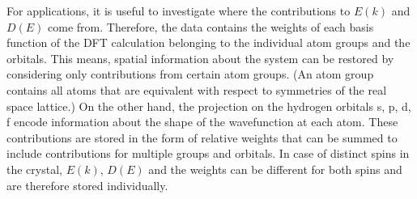 For applications, it is useful to investigate where the contributions to $E(k)$ and $D(E)$ come from. Therefore, the data contains the weights of each basis function of the DFT calculation belonging to the individual atom groups and the orbitals. This means, spatial information about the system can be restored by considering only contributions from certain atom groups. (An atom group contains all atoms that are equivalent with respect to symmetries of the real space lattice.) On the other hand, the projection on the hydrogen orbitals s, p, d, f encode information about the shape of the wavefunction at each atom. These contributions are stored in the form of relative weights that can be summed to include contributions for multiple groups and orbitals. In case of distinct spins in the crystal, $E(k)$, $D(E)$ and the weights can be different for both spins and are therefore stored individually.




